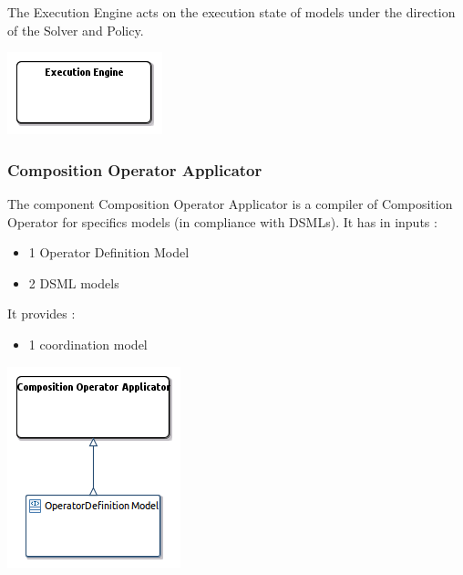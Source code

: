\documentclass{gemoc} %
\begin{document}
The Execution Engine acts on the execution state of models under the direction of the Solver and Policy.
\begin{center}
\includegraphics*[trim=0.0cm 0.0cm 0cm 0.0cm, clip=true]{../images/generated/Generated_Execution_Engine.png}
\end{center}



\subsubsection{Composition Operator Applicator}
\label{sec:Composition_Operator_Applicator}
The component Composition Operator Applicator is a compiler of Composition Operator for specifics models (in compliance with DSMLs).
\newline It has in inputs :
\begin{itemize}
\item 1 Operator Definition Model
\item 2 DSML models
\end{itemize}
It provides :
\begin{itemize}
\item 1 coordination model
\end{itemize}
\begin{center}
\includegraphics*[trim=0.0cm 0.0cm 0cm 0.0cm, clip=true]{../images/generated/Generated_Composition_Operator_Applicator.png}
\end{center}
\end{document}
